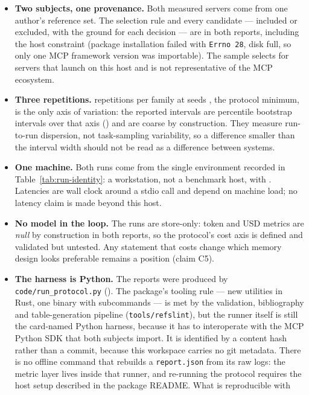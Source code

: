 \documentclass[11pt,a4paper]{article}
\begin{document}
\begin{itemize}[leftmargin=1.4em]
\item \textbf{Two subjects, one provenance.} Both measured servers come from one author's
reference set. The selection rule and every candidate --- included or excluded, with the ground
for each decision --- are in both reports, including the host constraint (package installation
failed with \texttt{Errno 28}, disk full, so only one MCP framework version was importable).
The sample selects for servers that launch on this host and is not representative of the MCP
ecosystem.
\item \textbf{Three repetitions.}  repetitions per family at seeds
, the protocol minimum, is the only axis of variation: the reported intervals are
percentile bootstrap intervals over that axis () and are coarse by
construction. They measure run-to-run dispersion, not task-sampling variability, so a difference
smaller than the interval width should not be read as a difference between systems.
\item \textbf{One machine.} Both runs come from the single environment recorded in
Table~\ref{tab:run-identity}: a workstation, not a benchmark host, with
. Latencies are wall clock around a stdio call and depend on
machine load; no latency claim is made beyond this host.
\item \textbf{No model in the loop.} The runs are store-only: token and USD metrics are
\textit{null} by construction in both reports, so the protocol's cost axis is defined and
validated but untested. Any statement that costs change which memory design looks preferable
remains a position (claim C5).
\item \textbf{The harness is Python.} The reports were produced by
\texttt{code/run\_protocol.py} (). The package's tooling
rule --- new utilities in Rust, one binary with subcommands --- is met by the validation,
bibliography and table-generation pipeline (\texttt{tools/refslint}), but the runner itself is
still the card-named Python harness, because it has to interoperate with the MCP Python SDK that
both subjects import. It is identified by a content hash rather than a commit, because this
workspace carries no git metadata. There is no offline command that rebuilds a
\texttt{report.json} from its raw logs: the metric layer lives inside that runner, and re-running
the protocol requires the host setup described in the package README. What is reproducible with

\end{itemize}
\end{document}

